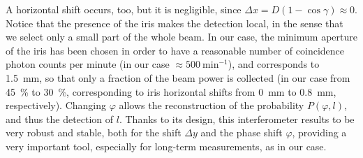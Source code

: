\documentclass[
reprint,
amsmath,amssymb,
aps,
showkeys
]{revtex4-2}
\begin{document}
A horizontal shift occurs, too, but it is negligible, since $\Delta x = D\left(1-\cos{\gamma}\right) \approx 0$.
Notice that the presence of the iris makes the detection local, in the sense that we select only a small part of the whole beam.
In our case, the minimum aperture of the iris has been chosen in order to have a reasonable number of coincidence photon counts per minute (in our case $\approx \SI{500}{\minute^{-1}}$), and corresponds to \SI{1.5}{\milli\meter}, so that only a fraction of the beam power is collected (in our case from \SI{45}{\percent} to \SI{30}{\percent}, corresponding to iris horizontal shifts from \SI{0}{\milli\meter} to \SI{0.8}{\milli\meter}, respectively).
Changing $\varphi$ allows the reconstruction of the probability $P\left(\varphi,l\right)$, and thus the detection of $l$.
Thanks to its design, this interferometer results to be very robust and stable, both for the shift $\Delta y$ and the phase shift $\varphi$, providing a very important tool, especially for long-term measurements, as in our case.
\end{document}

